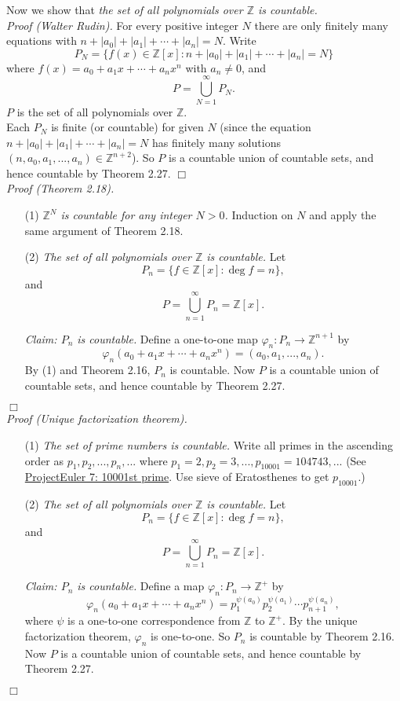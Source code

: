 \documentclass{article}
\begin{document}
Now we show that
\emph{the set of all polynomials over $\mathbb{Z}$ is countable.} \\

\emph{Proof (Walter Rudin).}
For every positive integer $N$ there are only finitely many equations with
$n + |a_0| + |a_1| + \cdots + |a_n| = N.$
Write
$$P_N = \{ f(x) \in \mathbb{Z}[x] : n + |a_0| + |a_1| + \cdots + |a_n| = N \}$$
where $f(x) = a_0 + a_1 x + \cdots + a_n x^n$ with $a_n \neq 0$,
and
$$P = \bigcup_{N = 1}^{\infty} P_N.$$
$P$ is the set of all polynomials over $\mathbb{Z}$. \\

Each $P_N$ is finite (or countable) for given $N$
(since the equation $n + |a_0| + |a_1| + \cdots + |a_n| = N$
has finitely many solutions
$(n, a_0, a_1, ..., a_n) \in \mathbb{Z}^{n+2}$).
So $P$ is a countable union of countable sets, and hence countable
by Theorem 2.27.
$\Box$ \\

\emph{Proof (Theorem 2.18).}
\begin{enumerate}
\item[(1)]
\emph{$\mathbb{Z}^N$ is countable for any integer $N > 0$.}
Induction on $N$ and apply the same argument of Theorem 2.18.
\item[(2)]
\emph{The set of all polynomials over $\mathbb{Z}$ is countable.}
Let
$$P_n = \{ f \in \mathbb{Z}[x] : \deg f = n \},$$
and
$$P = \bigcup_{n = 1}^{\infty} P_n = \mathbb{Z}[x].$$

\emph{Claim: $P_n$ is countable.}
Define a one-to-one map $\varphi_n: P_n \rightarrow \mathbb{Z}^{n+1}$ by
$$\varphi_n(a_0 + a_1 x + \cdots + a_n x^n)
= (a_0, a_1, ..., a_n).$$
By (1) and Theorem 2.16, $P_n$ is countable.
Now $P$ is a countable union of countable sets,
and hence countable by Theorem 2.27.
\end{enumerate}
$\Box$ \\

\emph{Proof (Unique factorization theorem).}
\begin{enumerate}
\item[(1)]
\emph{The set of prime numbers is countable.}
Write all primes in the ascending order as $p_1, p_2, ..., p_n, ...$
where $p_1 = 2, p_2 = 3, ..., p_{10001} = 104743, ...$
(See \href{https://projecteuler.net/problem=7}{ProjectEuler 7: 10001st prime}.
Use sieve of Eratosthenes to get $p_{10001}$.)
\item[(2)]
\emph{The set of all polynomials over $\mathbb{Z}$ is countable.}
Let
$$P_n = \{ f \in \mathbb{Z}[x] : \deg f = n \},$$
and
$$P = \bigcup_{n = 1}^{\infty} P_n = \mathbb{Z}[x].$$

\emph{Claim: $P_n$ is countable.}
Define a map $\varphi_n: P_n \rightarrow \mathbb{Z}^+$ by
$$\varphi_n(a_0 + a_1 x + \cdots + a_n x^n)
= p_1^{\psi(a_0)} p_2^{\psi(a_1)} \cdots p_{n+1}^{\psi(a_n)},$$
where $\psi$ is a one-to-one correspondence from $\mathbb{Z}$ to $\mathbb{Z}^+$.
By the unique factorization theorem, $\varphi_n$ is one-to-one.
So $P_n$ is countable by Theorem 2.16.
Now $P$ is a countable union of countable sets,
and hence countable by Theorem 2.27.
\end{enumerate}
$\Box$ \\\\
\end{document}
